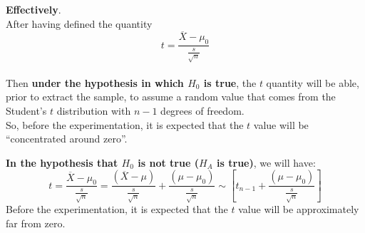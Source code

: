 \begin{frame}
  \vspace*{.25cm}
  \textbf{Effectively}.\\
  \vspace*{.5cm}
  After having defined the quantity 
  $$ t=\frac{\overline{X}-\mu_0}{\frac{s}{\sqrt{n}}} $$\\
  Then \textbf{under the hypothesis in which {\boldmath$H_0$} is true}, the $ t $ quantity will be able, prior to extract the sample, to assume a random value that comes from the Student's $ t $ distribution with $ n-1 $ degrees of freedom.\\
  \vspace*{.25cm}
  So, before the experimentation, it is expected that the $ t $ value will be ``concentrated around zero''.\\
\end{frame}

\begin{frame}
  \textbf{In the hypothesis that {\boldmath $ H_0 $} is not true ({\boldmath$H_A$} is true)}, we will have:
  $$ t = \frac{\overline{X}-\mu_0}{\frac{s}{\sqrt{n}}} = \frac{(\overline{X}-\mu)}{\frac{s}{\sqrt{n}}}+\frac{(\mu-\mu_0)}{\frac{s}{\sqrt{n}}}\sim \left[t_{n-1}+\frac{(\mu-\mu_0)}{\frac{s}{\sqrt{n}}}\right] $$
  Before the experimentation, it is expected that the $ t $ value will be approximately far from zero.
\end{frame}

